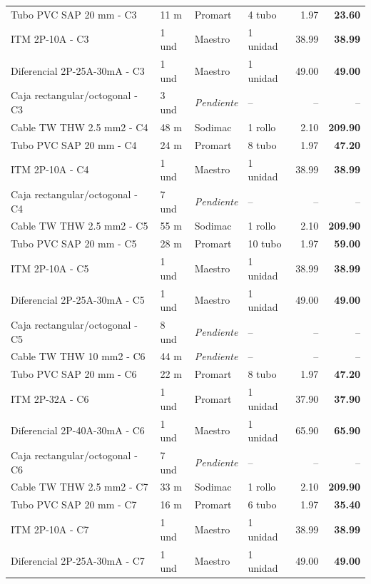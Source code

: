 \begin{longtable}{p{5.0cm} p{1.5cm} p{2.2cm} p{2.2cm} r r}
Tubo PVC SAP 20 mm - C3 & 11 m & Promart & 4 tubo & 1.97 & \textbf{23.60} \\
ITM 2P-10A - C3 & 1 und & Maestro & 1 unidad & 38.99 & \textbf{38.99} \\
Diferencial 2P-25A-30mA - C3 & 1 und & Maestro & 1 unidad & 49.00 & \textbf{49.00} \\
Caja rectangular/octogonal - C3 & 3 und & \textit{Pendiente} & -- & -- & -- \\
Cable TW THW 2.5 mm2 - C4 & 48 m & Sodimac & 1 rollo & 2.10 & \textbf{209.90} \\
Tubo PVC SAP 20 mm - C4 & 24 m & Promart & 8 tubo & 1.97 & \textbf{47.20} \\
ITM 2P-10A - C4 & 1 und & Maestro & 1 unidad & 38.99 & \textbf{38.99} \\
Caja rectangular/octogonal - C4 & 7 und & \textit{Pendiente} & -- & -- & -- \\
Cable TW THW 2.5 mm2 - C5 & 55 m & Sodimac & 1 rollo & 2.10 & \textbf{209.90} \\
Tubo PVC SAP 20 mm - C5 & 28 m & Promart & 10 tubo & 1.97 & \textbf{59.00} \\
ITM 2P-10A - C5 & 1 und & Maestro & 1 unidad & 38.99 & \textbf{38.99} \\
Diferencial 2P-25A-30mA - C5 & 1 und & Maestro & 1 unidad & 49.00 & \textbf{49.00} \\
Caja rectangular/octogonal - C5 & 8 und & \textit{Pendiente} & -- & -- & -- \\
Cable TW THW 10 mm2 - C6 & 44 m & \textit{Pendiente} & -- & -- & -- \\
Tubo PVC SAP 20 mm - C6 & 22 m & Promart & 8 tubo & 1.97 & \textbf{47.20} \\
ITM 2P-32A - C6 & 1 und & Promart & 1 unidad & 37.90 & \textbf{37.90} \\
Diferencial 2P-40A-30mA - C6 & 1 und & Maestro & 1 unidad & 65.90 & \textbf{65.90} \\
Caja rectangular/octogonal - C6 & 7 und & \textit{Pendiente} & -- & -- & -- \\
Cable TW THW 2.5 mm2 - C7 & 33 m & Sodimac & 1 rollo & 2.10 & \textbf{209.90} \\
Tubo PVC SAP 20 mm - C7 & 16 m & Promart & 6 tubo & 1.97 & \textbf{35.40} \\
ITM 2P-10A - C7 & 1 und & Maestro & 1 unidad & 38.99 & \textbf{38.99} \\
Diferencial 2P-25A-30mA - C7 & 1 und & Maestro & 1 unidad & 49.00 & \textbf{49.00} \\

\end{longtable}
